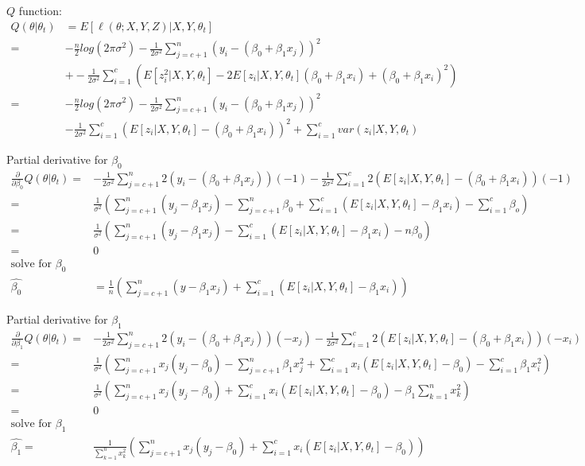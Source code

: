 \documentclass{article}\usepackage[]{graphicx}\usepackage[]{color}
\begin{document}
$Q$ function:
$$\begin{aligned}
Q(\theta | \theta_t)&= E[\ell(\theta; X, Y, Z)|X,Y, \theta_t] \\
=& -\frac{n}{2} log(2 \pi \sigma^2) - \frac{1}{2\sigma^2} \sum^n_{j=c+1}(y_i - (\beta_0 + \beta_1x_j))^2 \\
&+ -\frac{1}{2\sigma^2} \sum^c_{i=1}(E[z^2_i | X,Y,\theta_t] - 2E[z_i|X,Y,\theta_t](\beta_0 + \beta_1x_i) + (\beta_0 + \beta_1x_i)^2 )\\
=& -\frac{n}{2} log(2\pi\sigma^2) - \frac{1}{2\sigma^2} \sum_{j=c+1}^n (y_i - (\beta_0 + \beta_1x_j))^2  \\
&- \frac{1}{2\sigma^2} \sum_{i=1}^c (E[z_i|X,Y,\theta_t] - (\beta_0 + \beta_1x_i))^2 + \sum_{i=1}^c var(z_i|X,Y,\theta_t) 
\end{aligned}$$

Partial derivative for $\beta_0$
$$\begin{aligned}
\frac{\partial}{\partial \beta_0} Q(\theta|\theta_t)  =& -\frac{1}{2\sigma^2} \sum_{j=c+1}^n 2(y_i - (\beta_0 + \beta_1x_j))(-1) - \frac{1}{2\sigma^2} \sum_{i=1}^c 2(E[z_i|X,Y,\theta_t] - (\beta_0 + \beta_1 x_i)) (-1) \\
=& \frac{1}{\sigma^2} (\sum_{j=c+1}^n(y_j - \beta_1x_j) - \sum_{j=c+1}^n \beta_0 + \sum_{i=1}^c (E[z_i|X,Y,\theta_t] - \beta_1x_i) - \sum_{i=1}^c\beta_o) \\
=& \frac{1}{\sigma^2} (\sum^n_{j=c+1} (y_j - \beta_1x_j) - \sum_{i=1}^c (E[z_i|X,Y,\theta_t] - \beta_1x_i) - n\beta_0) \\
=& 0 \\
\text{solve for } \beta_0 & \\
\hat{\beta_0} &= \frac{1}{n} (\sum^n_{j = c+1} (y-\beta_1 x_j) + \sum_{i=1}^c (E[z_i|X,Y,\theta_t] - \beta_1 x_i))
\end{aligned}$$

Partial derivative for $\beta_1$
$$\begin{aligned}
\frac{\partial}{\partial \beta_1} Q(\theta|\theta_t)  =&- \frac{1}{2\sigma^2} \sum_{j=c+1}^n 2(y_i - (\beta_0 + \beta_1x_j))(-x_j) - \frac{1}{2\sigma^2} \sum_{i=1}^c 2(E[z_i | X,Y,\theta_t] - (\beta_0 + \beta_1x_i)) (-x_i) \\
=& \frac{1}{\sigma^2} (\sum_{j=c+1}^n x_j (y_j - \beta_0)- \sum^n_{j=c+1} \beta_1 x_j^2 + \sum_{i=1}^c x_i (E[z_i | X,Y,\theta_t] - \beta_0) - \sum_{i=1}^c \beta_1 x_i^2) \\
=& \frac{1}{\sigma^2} (\sum^n_{j=c+1} x_j(y_j-\beta_0) + \sum_{i=1}^c x_i(E[z_i|X,Y,\theta_t] - \beta_0 ) - \beta_1 \sum_{k=1}^n x_k^2) \\
=& 0 \\
\text{solve for }\beta_1 &\\
\hat{\beta_1} =& \frac{1}{\sum_{k=1}^nx_k^2} (\sum_{j=c+1}^n x_j (y_j - \beta_0) + \sum_{i=1}^c x_i(E[z_i|X,Y,\theta_t] - \beta_0))
\end{aligned}$$
\end{document}
